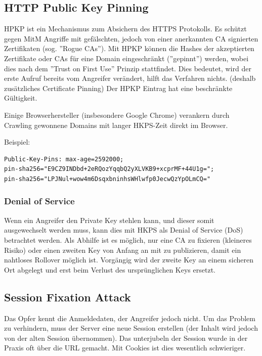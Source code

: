 \subsection{HTTP Public Key Pinning}
HPKP ist ein Mechanismus zum Absichern des HTTPS Protokolls. Es schützt gegen MitM Angriffe mit gefälschten, jedoch von einer anerkannten CA signierten Zertifikaten (sog. ''Rogue CAs''). Mit HPKP können die Hashes der akzeptierten Zertifikate oder CAs für eine Domain eingeschränkt (''gepinnt'') werden, wobei dies nach dem ''Trust on First Use'' Prinzip stattfindet. Dies bedeutet, wird der erste Aufruf bereits vom Angreifer verändert, hilft das Verfahren nichts. (deshalb zusätzliches Certificate Pinning) Der HPKP Eintrag hat eine beschränkte Gültigkeit.

Einige Browserhersteller (insbesondere Google Chrome) verankern durch Crawling gewonnene Domains mit langer HKPS-Zeit direkt im Browser.

Beispiel:

\begin{lstlisting}
Public-Key-Pins: max-age=2592000;
pin-sha256="E9CZ9INDbd+2eRQozYqqbQ2yXLVKB9+xcprMF+44U1g=";
pin-sha256="LPJNul+wow4m6DsqxbninhsWHlwfp0JecwQzYpOLmCQ="
\end{lstlisting}

\subsubsection{Denial of Service}
Wenn ein Angreifer den Private Key stehlen kann, und dieser somit ausgewechselt werden muss, kann dies mit HKPS als Denial of Service (DoS) betrachtet werden. Als Abhilfe ist es möglich, nur eine CA zu fixieren (kleineres Risiko) oder einen zweiten Key von Anfang an mit zu publizieren, damit ein nahtloses Rollover möglich ist. Vorgängig wird der zweite Key an einem sicheren Ort abgelegt und erst beim  Verlust des ursprünglichen Keys ersetzt.


\subsection{Session Fixation Attack}
Das Opfer kennt die Anmeldedaten, der Angreifer jedoch nicht. Um das Problem zu verhindern, muss der Server eine neue Session erstellen (der Inhalt wird jedoch von der alten Session übernommen). Das unterjubeln der Session wurde in der Praxis oft über die URL gemacht. Mit Cookies ist dies wesentlich schwieriger.

\newpage

